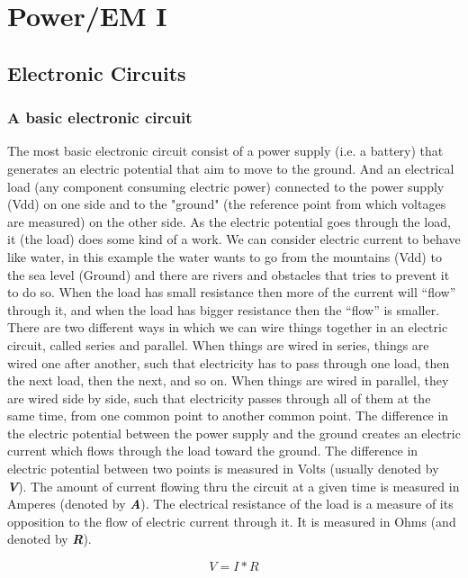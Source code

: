 \chapter{Power/EM I} \label{c4_forthchapter:cha}
\section{Electronic Circuits}
\subsection{A basic electronic circuit}
The most basic electronic circuit consist of a power supply (i.e. a battery) that generates an electric potential that aim to move to the ground. And an electrical load (any component consuming electric power) connected to the power supply (Vdd) on one side and to the "ground" (the reference point from which voltages are measured) on the other side. As the electric potential goes through the load, it (the load) does some kind of a work. We can consider electric current to behave like water, in this example the water wants to go from the mountains (Vdd) to the sea level (Ground) and there are rivers and obstacles that tries to prevent it to do so. When the load has small resistance then more of the current will “flow” through it, and when the load has bigger resistance then the “flow” is smaller.  
There are two different ways in which we can wire things together in an electric circuit, called series and parallel.
When things are wired in series, things are wired one after another, such that electricity has to pass through one load, then the next load, then the next, and so on.
When things are wired in parallel, they are wired side by side, such that electricity passes through all of them at the same time, from one common point to another common point.
The difference in the electric potential between the power supply and the ground creates an electric current which flows through the load toward the ground.
The difference in electric potential between two points is measured in Volts (usually denoted by \textbf{\textit{V}}). The amount of current flowing thru the circuit at a given time is measured in Amperes (denoted by \textbf{\textit{A}}).
The electrical resistance of the load is a measure of its opposition to the flow of electric current through it. It is measured in Ohms (and denoted by \textbf{\textit{R}}).

\begin{displaymath}\label{eq:ohm}
V=I*R
\end{displaymath}
